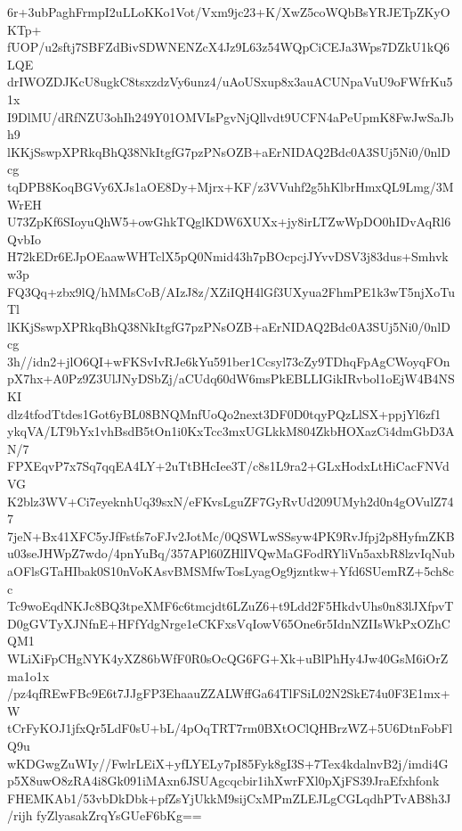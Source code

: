 6r+3ubPaghFrmpI2uLLoKKo1Vot/Vxm9jc23+K/XwZ5coWQbBsYRJETpZKyOKTp+
fUOP/u2sftj7SBFZdBivSDWNENZcX4Jz9L63z54WQpCiCEJa3Wps7DZkU1kQ6LQE
drIWOZDJKcU8ugkC8tsxzdzVy6unz4/uAoUSxup8x3auACUNpaVuU9oFWfrKu51x
I9DlMU/dRfNZU3ohIh249Y01OMVIsPgvNjQllvdt9UCFN4aPeUpmK8FwJwSaJbh9
lKKjSswpXPRkqBhQ38NkItgfG7pzPNsOZB+aErNIDAQ2Bdc0A3SUj5Ni0/0nlDcg
tqDPB8KoqBGVy6XJs1aOE8Dy+Mjrx+KF/z3VVuhf2g5hKlbrHmxQL9Lmg/3MWrEH
U73ZpKf6SIoyuQhW5+owGhkTQglKDW6XUXx+jy8irLTZwWpDO0hIDvAqRl6QvbIo
H72kEDr6EJpOEaawWHTclX5pQ0Nmid43h7pBOcpcjJYvvDSV3j83dus+Smhvkw3p
FQ3Qq+zbx9lQ/hMMsCoB/AIzJ8z/XZiIQH4lGf3UXyua2FhmPE1k3wT5njXoTuTl
lKKjSswpXPRkqBhQ38NkItgfG7pzPNsOZB+aErNIDAQ2Bdc0A3SUj5Ni0/0nlDcg
3h//idn2+jlO6QI+wFKSvIvRJe6kYu591ber1Ccsyl73cZy9TDhqFpAgCWoyqFOn
pX7hx+A0Pz9Z3UlJNyDSbZj/aCUdq60dW6msPkEBLLIGikIRvbol1oEjW4B4NSKI
dlz4tfodTtdes1Got6yBL08BNQMnfUoQo2next3DF0D0tqyPQzLlSX+ppjYl6zf1
ykqVA/LT9bYx1vhBsdB5tOn1i0KxTcc3mxUGLkkM804ZkbHOXazCi4dmGbD3AN/7
FPXEqvP7x7Sq7qqEA4LY+2uTtBHcIee3T/c8s1L9ra2+GLxHodxLtHiCacFNVdVG
K2blz3WV+Ci7eyeknhUq39sxN/eFKvsLguZF7GyRvUd209UMyh2d0n4gOVulZ747
7jeN+Bx41XFC5yJfFstfs7oFJv2JotMc/0QSWLwSSsyw4PK9RvJfpj2p8HyfmZKB
u03seJHWpZ7wdo/4pnYuBq/357APl60ZHlIVQwMaGFodRYliVn5axbR8lzvIqNub
aOFlsGTaHIbak0S10nVoKAsvBMSMfwTosLyagOg9jzntkw+Yfd6SUemRZ+5ch8cc
Tc9woEqdNKJc8BQ3tpeXMF6c6tmcjdt6LZuZ6+t9Ldd2F5HkdvUhs0n83lJXfpvT
D0gGVTyXJNfnE+HFfYdgNrge1eCKFxsVqIowV65One6r5IdnNZIIsWkPxOZhCQM1
WLiXiFpCHgNYK4yXZ86bWfF0R0sOcQG6FG+Xk+uBlPhHy4Jw40GsM6iOrZma1o1x
/pz4qfREwFBc9E6t7JJgFP3EhaauZZALWffGa64TlFSiL02N2SkE74u0F3E1mx+W
tCrFyKOJ1jfxQr5LdF0sU+bL/4pOqTRT7rm0BXtOClQHBrzWZ+5U6DtnFobFlQ9u
wKDGwgZuWIy//FwlrLEiX+yfLYELy7pI85Fyk8gI3S+7Tex4kdalnvB2j/imdi4G
p5X8uwO8zRA4i8Gk091iMAxn6JSUAgcqcbir1ihXwrFXl0pXjFS39JraEfxhfonk
FHEMKAb1/53vbDkDbk+pfZsYjUkkM9sijCxMPmZLEJLgCGLqdhPTvAB8h3J/rijh
fyZlyasakZrqYsGUeF6bKg==
